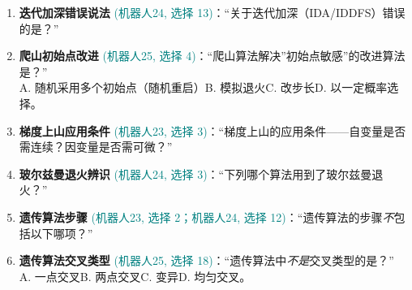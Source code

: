 ﻿\documentclass[../main.tex]{subfiles}
\begin{document}
\begin{enumerate}[itemsep=0.45em, topsep=0.2em, leftmargin=1.5em]
    \item \textbf{迭代加深错误说法} \textcolor{teal}{(机器人24, 选择 13)}：``关于迭代加深（IDA/IDDFS）错误的是？''\\
     

    \item \textbf{爬山初始点改进} \textcolor{teal}{(机器人25, 选择 4)}：``爬山算法解决''初始点敏感''的改进算法是？''\\
    A. 随机采用多个初始点（随机重启）\quad B. 模拟退火\quad C. 改步长\quad D. 以一定概率选择。 

    \item \textbf{梯度上山应用条件} \textcolor{teal}{(机器人23, 选择 3)}：``梯度上山的应用条件——自变量是否需连续？因变量是否需可微？''\\
     

    \item \textbf{玻尔兹曼退火辨识} \textcolor{teal}{(机器人24, 选择 3)}：``下列哪个算法用到了玻尔兹曼退火？''\\
     

    \item \textbf{遗传算法步骤} \textcolor{teal}{(机器人23, 选择 2；机器人24, 选择 12)}：``遗传算法的步骤\emph{不}包括以下哪项？''\\
     

    \item \textbf{遗传算法交叉类型} \textcolor{teal}{(机器人25, 选择 18)}：``遗传算法中\emph{不是}交叉类型的是？''\\
    A. 一点交叉\quad B. 两点交叉\quad C. 变异\quad D. 均匀交叉。 
\end{enumerate}
\end{document}
